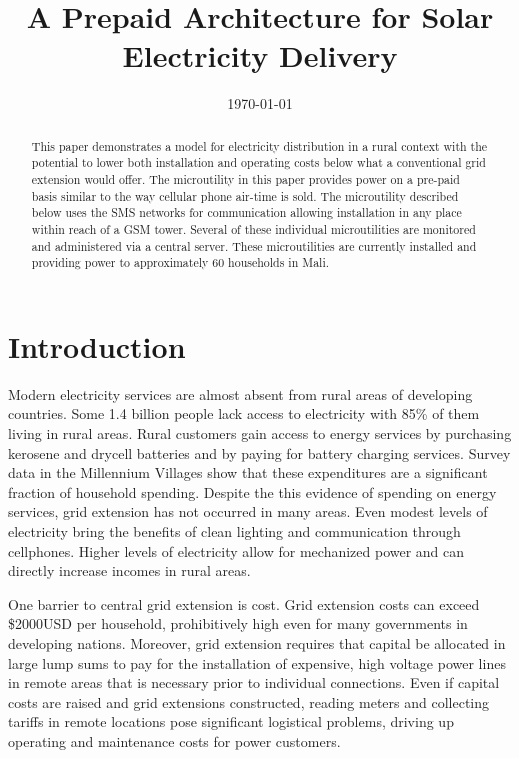 \documentclass{sig-alternate}
\begin{document}
\title{A Prepaid Architecture for Solar Electricity Delivery}
\date{\today}
\maketitle

\begin{abstract}
This paper demonstrates a model for electricity
distribution in a rural context with the potential
to lower both installation and operating costs below
what a conventional grid extension would offer.
The microutility in this paper provides power on a
pre-paid basis similar to the way cellular phone
air-time is sold.
The microutility described below uses the SMS networks
for communication allowing installation in any place
within reach of a GSM tower.
Several of these individual microutilities are monitored
and administered via a central server.
These microutilities are currently installed and providing
power to approximately 60 households in Mali.
\end{abstract}

\section{Introduction}
Modern electricity services are almost absent from rural
areas of developing countries.
Some 1.4 billion people lack access to electricity with 85\% of
them living in rural areas.\cite{WEO2010}
Rural customers gain access to energy services by purchasing
kerosene and drycell batteries and by paying for battery charging
services.
Survey data in the Millennium Villages show that these expenditures
are a significant fraction of household spending.\cite{MVPEnergy}
Despite the this evidence of spending on energy services,
grid extension has not occurred in many areas.
Even modest levels of electricity bring the benefits of clean lighting
and communication through cellphones.\cite{Cabraal:2005}
Higher levels of electricity allow for mechanized power and can
directly increase incomes in rural areas.\cite{Kirubi:2009}

One barrier to central grid extension is cost.
Grid extension costs can exceed \$2000USD per household, prohibitively
high even for many governments in developing
nations.\cite{ModiPlanningKenya}
Moreover, grid extension requires that capital be allocated in large
lump sums to pay for the installation of expensive, high voltage power
lines in remote areas that is necessary prior to individual connections.
Even if capital costs are raised and grid extensions constructed,
reading meters and collecting tariffs in remote locations pose
significant logistical problems, driving up operating and maintenance
costs for power customers.
\end{document}
